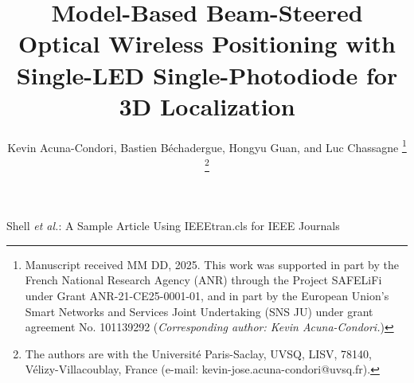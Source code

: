 \documentclass[journal]{IEEEtran}
\begin{document}

\title{Model-Based Beam-Steered Optical Wireless Positioning with Single-LED Single-Photodiode for 3D Localization}
\author{Kevin Acuna-Condori, Bastien Béchadergue, Hongyu Guan, and Luc Chassagne
\thanks{Manuscript received MM DD, 2025.
This work was supported in part by the French National Research Agency (ANR) through the Project SAFELiFi under Grant ANR-21-CE25-0001-01, and in part by the European Union's Smart Networks and Services Joint Undertaking (SNS JU) under grant agreement No. 101139292 (\textit{Corresponding author: Kevin Acuna-Condori.})
}
\thanks{
The authors are with the Université Paris-Saclay, UVSQ, LISV, 78140, Vélizy-Villacoublay, France (e-mail: kevin-jose.acuna-condori@uvsq.fr).
}
}
%
{Shell \MakeLowercase{\textit{et al.}}: A Sample Article Using IEEEtran.cls for IEEE Journals}
\maketitle
\end{document}

